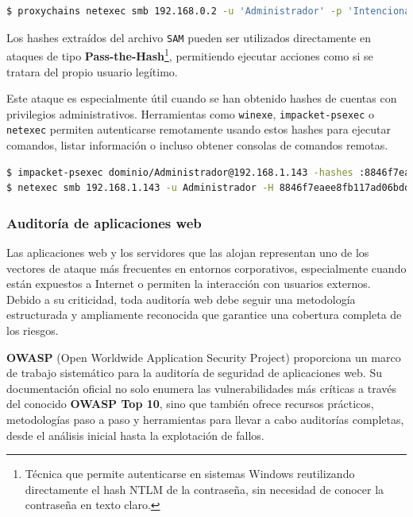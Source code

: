 \documentclass[a4paper, 11pt]{article}
\begin{document}
\begin{lstlisting}[language=bash, style=terminalstyle, caption=Abuso del túnel SOCKS con netexec]
$ proxychains netexec smb 192.168.0.2 -u 'Administrador' -p 'Intencionadamente Errónea' -d 'dominio' --sam
\end{lstlisting}

Los hashes extraídos del archivo \texttt{SAM} pueden ser utilizados directamente en ataques de tipo \textbf{Pass-the-Hash}\footnote{Técnica que permite autenticarse en sistemas Windows reutilizando directamente el hash NTLM de la contraseña, sin necesidad de conocer la contraseña en texto claro.}, permitiendo ejecutar acciones como si se tratara del propio usuario legítimo.

Este ataque es especialmente útil cuando se han obtenido hashes de cuentas con privilegios administrativos. Herramientas como \texttt{winexe}, \texttt{impacket-psexec} o \texttt{netexec} permiten autenticarse remotamente usando estos hashes para ejecutar comandos, listar información o incluso obtener consolas de comandos remotas.

\begin{lstlisting}[language=bash, style=terminalstyle, caption=Ejemplo de Pass-the-Hash]
$ impacket-psexec dominio/Administrador@192.168.1.143 -hashes :8846f7eaee8fb117ad06bdd830b7586c
$ netexec smb 192.168.1.143 -u Administrador -H 8846f7eaee8fb117ad06bdd830b7586c --exec-method smbexec -x "whoami"
\end{lstlisting}



\subsubsection{Auditoría de aplicaciones web}

Las aplicaciones web y los servidores que las alojan representan uno de los vectores de ataque más frecuentes en entornos corporativos, 
especialmente cuando están expuestos a Internet o permiten la interacción con usuarios externos. Debido a su criticidad, toda auditoría 
web debe seguir una metodología estructurada y ampliamente reconocida que garantice una cobertura completa de los riesgos. 

\textbf{OWASP} (Open Worldwide Application Security Project) proporciona un marco de trabajo sistemático para la auditoría de seguridad de aplicaciones web. Su documentación oficial no solo enumera las vulnerabilidades más críticas a través del conocido \textbf{OWASP Top 10}, sino que también ofrece recursos prácticos, metodologías paso a paso y herramientas para llevar a cabo auditorías completas, desde el análisis inicial hasta la explotación de fallos.
\end{document}
